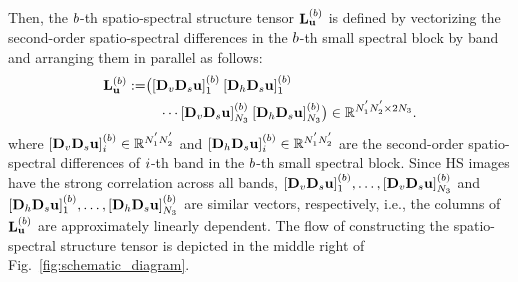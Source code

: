 \documentclass[10pt,journal]{IEEEtran}
\begin{document}
Then, the $b$-th spatio-spectral structure tensor $\mathbf{L}_{\mathbf{u}}^{(b)}$ is defined by vectorizing the second-order spatio-spectral differences in the $b$-th small spectral block by band and arranging them in parallel as follows:
\begin{equation}
\begin{split}
    \label{eq:SSST}
    \mathbf{L}_{\mathbf{u}}^{(b)} :=  
    &\bigl( \lbrack \mathbf{D}_{v} \mathbf{D}_{s} \mathbf{u} \rbrack_{1}^{(b)} \: 
    \lbrack\mathbf{D}_{h} \mathbf{D}_{s} \mathbf{u} \rbrack_{1}^{(b)} \\ 
    & \quad \cdots \lbrack \mathbf{D}_{v} \mathbf{D}_{s} \mathbf{u} \rbrack_{N_{3}}^{(b)} \:
    \lbrack\mathbf{D}_{h} \mathbf{D}_{s} \mathbf{u} \rbrack_{N_{3}}^{(b)} 
    \bigr) \in \mathbb{R}^{N_{1}^{'} N_{2}^{'} \times 2N_{3}}.
\end{split}
\end{equation}
where $\lbrack \mathbf{D}_{v} \mathbf{D}_{s} \mathbf{u} \rbrack_{i}^{(b)} \in \mathbb{R}^{N_{1}^{'} N_{2}^{'}}$ and $\lbrack \mathbf{D}_{h} \mathbf{D}_{s} \mathbf{u} \rbrack_{i}^{(b)} \in \mathbb{R}^{N_{1}^{'} N_{2}^{'}}$ are the second-order spatio-spectral differences of $i$-th band in the $b$-th small spectral block.
Since HS images have the strong correlation across all bands, $\lbrack \mathbf{D}_{v} \mathbf{D}_{s} \mathbf{u} \rbrack_{1}^{(b)}, \ldots, \lbrack \mathbf{D}_{v} \mathbf{D}_{s} \mathbf{u} \rbrack_{N_{3}}^{(b)}$ and $\lbrack \mathbf{D}_{h} \mathbf{D}_{s} \mathbf{u} \rbrack_{1}^{(b)}, \ldots, \lbrack \mathbf{D}_{h} \mathbf{D}_{s} \mathbf{u} \rbrack_{N_{3}}^{(b)}$ are similar vectors, respectively, i.e., the columns of $\mathbf{L}_{\mathbf{u}}^{(b)}$ are approximately linearly dependent.
The flow of constructing the spatio-spectral structure tensor is depicted in the middle right of Fig.~\ref{fig:schematic_diagram}.
\end{document}

